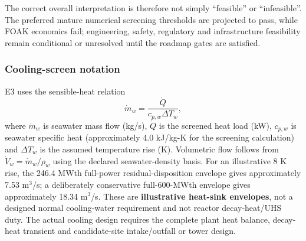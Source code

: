 The correct overall interpretation is therefore not simply ``feasible'' or ``infeasible''. The preferred mature numerical screening thresholds are projected to pass, while FOAK economics fail; engineering, safety, regulatory and infrastructure feasibility remain conditional or unresolved until the roadmap gates are satisfied.
\subsubsection{Cooling-screen notation}
E3 uses the sensible-heat relation
\[
\dot m_w=\frac{\dot Q}{c_{p,w}\Delta T_w},
\]
where $\dot m_w$ is seawater mass flow (kg/s), $\dot Q$ is the screened heat load (kW), $c_{p,w}$ is seawater specific heat (approximately 4.0 kJ/kg-K for the screening calculation) and $\Delta T_w$ is the assumed temperature rise (K). Volumetric flow follows from $\dot V_w=\dot m_w/\rho_w$ using the declared seawater-density basis. For an illustrative 8 K rise, the 246.4 MWth full-power residual-disposition envelope gives approximately 7.53 m$^3$/s; a deliberately conservative full-600-MWth envelope gives approximately 18.34 m$^3$/s. These are \textbf{illustrative heat-sink envelopes}, not a designed normal cooling-water requirement and not reactor decay-heat/UHS duty. The actual cooling design requires the complete plant heat balance, decay-heat transient and candidate-site intake/outfall or tower design.
